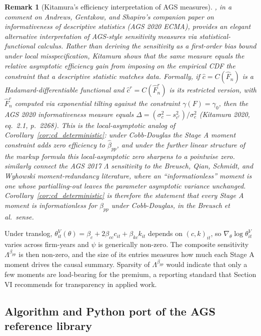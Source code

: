 \documentclass[11pt]{article}
\newtheorem{remark}{Remark}
\begin{document}
\begin{remark}[Kitamura's efficiency interpretation of AGS measures]\label{rem:kitamura}
\citet{Kitamura2020ECMA}, in a comment on Andrews, Gentzkow, and Shapiro's companion paper on informativeness of descriptive statistics (AGS 2020 ECMA), provides an elegant alternative interpretation of AGS-style sensitivity measures via statistical-functional calculus. Rather than deriving the sensitivity as a first-order bias bound under local misspecification, Kitamura shows that the same measure equals the \emph{relative asymptotic efficiency gain} from imposing on the empirical CDF the constraint that a descriptive statistic matches data. Formally, if $\hat c = C(\hat F_n)$ is a Hadamard-differentiable functional and $\hat c^r = C(\hat F_n^r)$ is its restricted version, with $\hat F_n^r$ computed via exponential tilting against the constraint $\gamma(F) = \gamma_0$, then the AGS 2020 informativeness measure equals $\Delta = (\sigma_c^2 - s_{c^r}^2)/\sigma_c^2$ (Kitamura 2020, eq.\ 2.1, p.~2268). This is the local-asymptotic analog of Corollary~\ref{cor:cd_deterministic}: under Cobb-Douglas the Stage A moment constraint adds zero efficiency to $\hat\beta_{pp}$, and under the further linear structure of the markup formula this local-asymptotic zero sharpens to a pointwise zero. \citet{HonoreJorgensenDePaula2020} similarly connect the AGS 2017 $\Lambda$ sensitivity to the Breusch, Qian, Schmidt, and Wyhowski \cite{BreuschQianSchmidtWyhowski1999} moment-redundancy literature, where an ``informationless'' moment is one whose partialling-out leaves the parameter asymptotic variance unchanged. Corollary~\ref{cor:cd_deterministic} is therefore the statement that \emph{every} Stage A moment is informationless for $\hat\beta_{pp}$ under Cobb-Douglas, in the Breusch et al.\ sense.
\end{remark}

Under translog, $\theta^V_{it}(\theta) = \beta_c + 2\beta_{cc} c_{it} + \beta_{kc} k_{it}$ depends on $(c,k)_{it}$, so $\nabla_\theta \log\theta^V_{it}$ varies across firm-years and $\psi$ is generically non-zero. The composite sensitivity $\Lambda^{\beta_{pp}}$ is then non-zero, and the size of its entries measures how much each Stage A moment drives the causal summary. Sparsity of $\Lambda^{\beta_{pp}}$ would indicate that only a few moments are load-bearing for the premium, a reporting standard that \citet{ABGRS2025} Section VI recommends for transparency in applied work.

\subsection{Algorithm and Python port of the AGS reference library}\label{sec:ags_algo}
\end{document}
